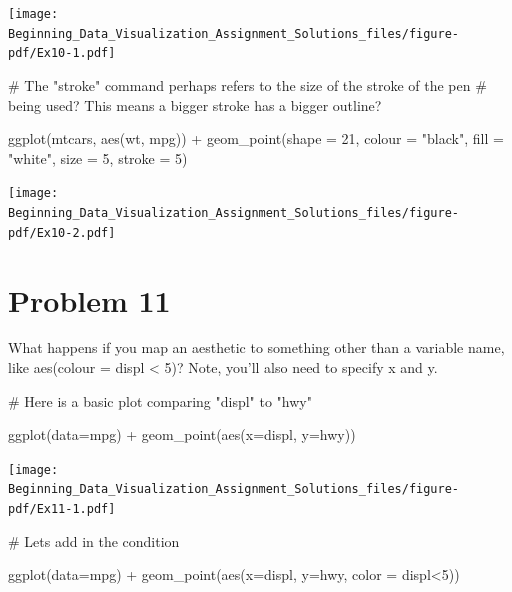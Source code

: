 \documentclass[
  letterpaper,
  DIV=11,
  numbers=noendperiod]{scrreprt}
\newenvironment{Shaded}{\begin{snugshade}}{\end{snugshade}}
\newcommand{\AttributeTok}[1]{\textcolor[rgb]{0.40,0.45,0.13}{#1}}
\newcommand{\CommentTok}[1]{\textcolor[rgb]{0.37,0.37,0.37}{#1}}
\newcommand{\DecValTok}[1]{\textcolor[rgb]{0.68,0.00,0.00}{#1}}
\newcommand{\FunctionTok}[1]{\textcolor[rgb]{0.28,0.35,0.67}{#1}}
\newcommand{\NormalTok}[1]{\textcolor[rgb]{0.00,0.23,0.31}{#1}}
\newcommand{\SpecialCharTok}[1]{\textcolor[rgb]{0.37,0.37,0.37}{#1}}
\newcommand{\StringTok}[1]{\textcolor[rgb]{0.13,0.47,0.30}{#1}}
\begin{document}
\texttt{[image: Beginning\_Data\_Visualization\_Assignment\_Solutions\_files/figure-pdf/Ex10-1.pdf]}

\begin{Shaded}
\begin{Highlighting}[]
\CommentTok{\# The "stroke" command perhaps refers to the size of the stroke of the pen }
\CommentTok{\# being used? This means a bigger stroke has a bigger outline?}

\FunctionTok{ggplot}\NormalTok{(mtcars, }\FunctionTok{aes}\NormalTok{(wt, mpg)) }\SpecialCharTok{+}
  \FunctionTok{geom\_point}\NormalTok{(}\AttributeTok{shape =} \DecValTok{21}\NormalTok{, }\AttributeTok{colour =} \StringTok{"black"}\NormalTok{, }\AttributeTok{fill =} \StringTok{"white"}\NormalTok{, }\AttributeTok{size =} \DecValTok{5}\NormalTok{, }\AttributeTok{stroke =} \DecValTok{5}\NormalTok{)}
\end{Highlighting}
\end{Shaded}

\texttt{[image: Beginning\_Data\_Visualization\_Assignment\_Solutions\_files/figure-pdf/Ex10-2.pdf]}

\section*{Problem 11}\label{problem-11-3}


What happens if you map an aesthetic to something other than a variable
name, like aes(colour = displ \textless{} 5)? Note, you'll also need to
specify x and y.

\begin{Shaded}
\begin{Highlighting}[]
\CommentTok{\# Here is a basic plot comparing "displ" to "hwy"}

\FunctionTok{ggplot}\NormalTok{(}\AttributeTok{data=}\NormalTok{mpg) }\SpecialCharTok{+}
  \FunctionTok{geom\_point}\NormalTok{(}\FunctionTok{aes}\NormalTok{(}\AttributeTok{x=}\NormalTok{displ, }\AttributeTok{y=}\NormalTok{hwy))}
\end{Highlighting}
\end{Shaded}

\texttt{[image: Beginning\_Data\_Visualization\_Assignment\_Solutions\_files/figure-pdf/Ex11-1.pdf]}

\begin{Shaded}
\begin{Highlighting}[]
\CommentTok{\# Let\textquotesingle{}s add in the condition }

\FunctionTok{ggplot}\NormalTok{(}\AttributeTok{data=}\NormalTok{mpg) }\SpecialCharTok{+}
  \FunctionTok{geom\_point}\NormalTok{(}\FunctionTok{aes}\NormalTok{(}\AttributeTok{x=}\NormalTok{displ, }\AttributeTok{y=}\NormalTok{hwy, }\AttributeTok{color =}\NormalTok{ displ}\SpecialCharTok{\textless{}}\DecValTok{5}\NormalTok{))}
\end{Highlighting}
\end{Shaded}
\end{document}
